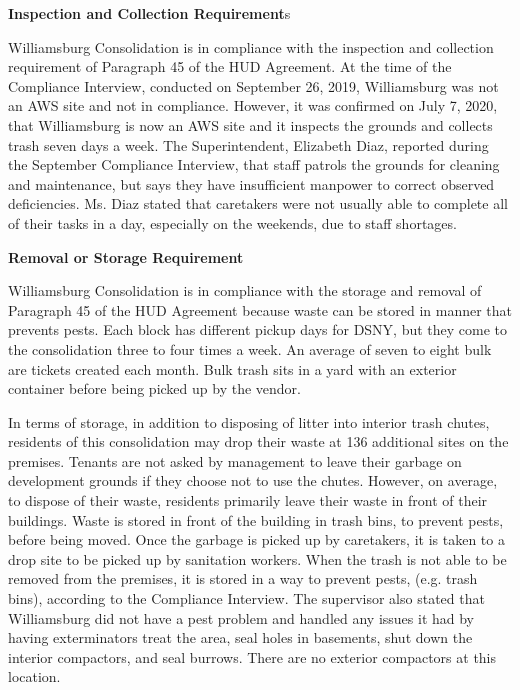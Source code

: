 
\textbf{Inspection and Collection Requirement}s

Williamsburg Consolidation is in compliance with the inspection and collection requirement of Paragraph 45 of the HUD Agreement. At the time of the Compliance Interview, conducted on September 26, 2019, Williamsburg was not an AWS site and not in compliance. However, it was confirmed on July 7, 2020, that Williamsburg is now an AWS site and it inspects the grounds and collects trash seven days a week. The Superintendent, Elizabeth Diaz, reported during the September Compliance Interview, that staff patrols the grounds for cleaning and maintenance, but says they have insufficient manpower to correct observed deficiencies. Ms. Diaz stated that caretakers were not usually able to complete all of their tasks in a day, especially on the weekends, due to staff shortages.

\textbf{Removal or Storage Requirement}

Williamsburg Consolidation is in compliance with the storage and removal of Paragraph 45 of the HUD Agreement because waste can be stored in manner that prevents pests. Each block has different pickup days for DSNY, but they come to the consolidation three to four times a week. An average of seven to eight bulk are tickets created each month.  Bulk trash sits in a yard with an exterior container before being picked up by the vendor. 

In terms of storage, in addition to disposing of litter into interior trash chutes, residents of this consolidation may drop their waste at 136 additional sites on the premises. Tenants are not asked by management to leave their garbage on development grounds if they choose not to use the chutes. However, on average, to dispose of  their waste, residents primarily leave their waste in front of their buildings. Waste is stored in front of the building in trash bins, to prevent pests, before being moved. Once the garbage is picked up by caretakers, it is taken to a drop site to be picked up by sanitation workers. When the trash is not able to be removed from the premises, it is stored in a way to prevent pests, (e.g. trash bins), according to the Compliance Interview. The supervisor also stated that Williamsburg did not have a pest problem and handled any issues it had by having exterminators treat the area, seal holes in basements, shut down the interior compactors, and seal burrows. There are no exterior compactors at this location.

